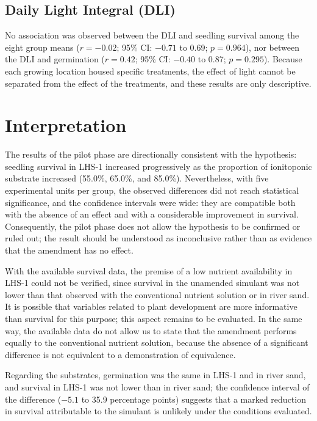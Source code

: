 \documentclass[11pt]{article}
\begin{document}
\begin{table}[H]
\caption{\capTabH}\label{tab:germ-contrasts}
\end{table}

\subsection{Daily Light Integral (DLI)}

No association was observed between the DLI and seedling survival among the eight group means ($r = -0.02$; 95\% CI: $-0.71$ to 0.69; $p = 0.964$), nor between the DLI and germination ($r = 0.42$; 95\% CI: $-0.40$ to 0.87; $p = 0.295$). Because each growing location housed specific treatments, the effect of light cannot be separated from the effect of the treatments, and these results are only descriptive.

\section{Interpretation}

The results of the pilot phase are directionally consistent with the hypothesis: seedling survival in LHS-1 increased progressively as the proportion of ionitoponic substrate increased (55.0\%, 65.0\%, and 85.0\%). Nevertheless, with five experimental units per group, the observed differences did not reach statistical significance, and the confidence intervals were wide: they are compatible both with the absence of an effect and with a considerable improvement in survival. Consequently, the pilot phase does not allow the hypothesis to be confirmed or ruled out; the result should be understood as inconclusive rather than as evidence that the amendment has no effect.

With the available survival data, the premise of a low nutrient availability in LHS-1 could not be verified, since survival in the unamended simulant was not lower than that observed with the conventional nutrient solution or in river sand. It is possible that variables related to plant development are more informative than survival for this purpose; this aspect remains to be evaluated. In the same way, the available data do not allow us to state that the amendment performs equally to the conventional nutrient solution, because the absence of a significant difference is not equivalent to a demonstration of equivalence.

Regarding the substrates, germination was the same in LHS-1 and in river sand, and survival in LHS-1 was not lower than in river sand; the confidence interval of the difference ($-5.1$ to 35.9 percentage points) suggests that a marked reduction in survival attributable to the simulant is unlikely under the conditions evaluated.
\end{document}
